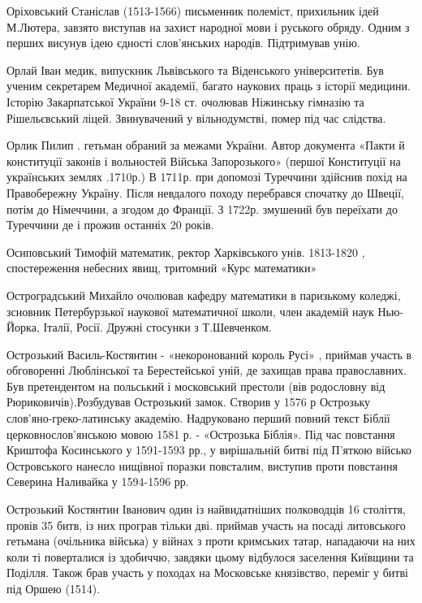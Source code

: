 Оріховський Станіслав  (1513-1566) письменник полеміст, прихильник ідей М.Лютера, завзято виступав на захист народної мови і руського обряду. Одним з перших висунув ідею єдності слов'янських народів. Підтримував унію.

Орлай Іван медик, випускник Львівського та Віденського університетів. Був ученим секретарем Медичної академії, багато наукових праць з історії медицини. Історію Закарпатської України 9-18 ст. очолював Ніжинську гімназію та Рішельєвський ліцей. Звинувачений у вільнодумстві, помер під час слідства.

Орлик Пилип . гетьман обраний за межами України. Автор документа «Пакти й конституції законів і вольностей Війська Запорозького» (першої Конституції на українських землях .1710р.) В 1711р. при допомозі Туреччини здійснив похід на Правобережну Україну. Після невдалого походу перебрався спочатку до Швеції, потім до Німеччини, а згодом до Франції. З 1722р. змушений був переїхати до Туреччини де і прожив останніх 20 років.

Осиповський Тимофій математик, ректор Харківського унів. 1813-1820 , спостереження небесних явищ, тритомний «Курс математики»

Остроградський Михайло очолював кафедру математики в паризькому коледжі, зсновник Петербурзької наукової математичної школи, член академій наук Нью-Йорка, Італії, Росії. Дружні стосунки з Т.Шевченком.

Острозький Василь-Костянтин  - «некоронований король Русі» , приймав участь в обговоренні Люблінської та Берестейської уній, де захищав права православних. Був претендентом на польський і московський престоли (вів родословну від Рюриковичів).Розбудував Острозький замок. Створив у 1576 р Острозьку слов'яно-греко-латинську академію. Надруковано перший повний текст Біблії церковнослов’янською мовою 1581 р. - «Острозька Біблія». Під час повстання Криштофа Косинського у 1591-1593 рр., у вирішальній битві під П’яткою військо Островського нанесло нищівної поразки повсталим, виступив проти повстання Северина Наливайка у 1594-1596 рр.

Острозький Костянтин Іванович  один із найвидатніших полководців 16 століття, провів 35 битв, із них програв тільки дві. приймав участь на посаді литовського гетьмана (очільника війська) у війнах з проти кримських татар, нападаючи на них коли ті поверталися із здобиччю, завдяки цьому відбулося заселення Київщини та Поділля. Також брав участь у походах на Московське князівство, переміг у битві під Оршею (1514).

